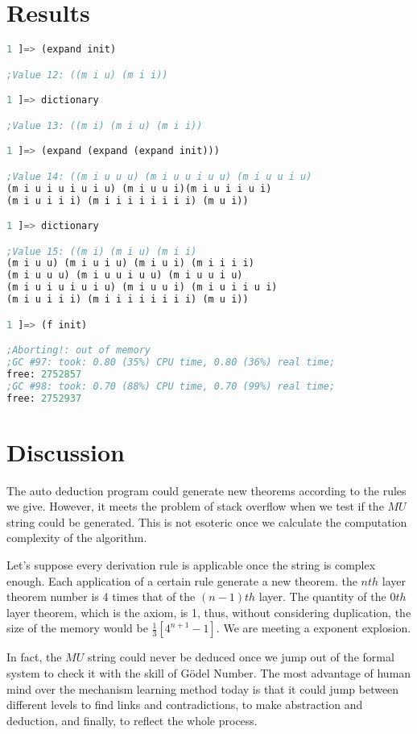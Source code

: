 \documentclass[11pt]{article}
\begin{document}
\section*{Results}
\begin{lstlisting}[language=lisp]
1 ]=> (expand init) 

;Value 12: ((m i u) (m i i)) 

1 ]=> dictionary 

;Value 13: ((m i) (m i u) (m i i)) 

1 ]=> (expand (expand (expand init))) 

;Value 14: ((m i u u u) (m i u u i u u) (m i u u i u) 
(m i u i u i u i u) (m i u u i)(m i u i i u i) 
(m i u i i i) (m i i i i i i i i) (m u i)) 

1 ]=> dictionary 

;Value 15: ((m i) (m i u) (m i i) 
(m i u u) (m i u i u) (m i u i) (m i i i i) 
(m i u u u) (m i u u i u u) (m i u u i u) 
(m i u i u i u i u) (m i u u i) (m i u i i u i)
(m i u i i i) (m i i i i i i i i) (m u i)) 

1 ]=> (f init) 

;Aborting!: out of memory 
;GC #97: took: 0.80 (35%) CPU time, 0.80 (36%) real time;
free: 2752857 
;GC #98: took: 0.70 (88%) CPU time, 0.70 (99%) real time;
free: 2752937 
\end{lstlisting}
 
\section*{Discussion}
The auto deduction program could generate new theorems according to the rules we give. However, it meets the problem of stack overflow when we test if the $MU$ string could be generated. This is not esoteric once we calculate the computation complexity of the algorithm.

Let's suppose every derivation rule is applicable once the string is complex enough. Each application of a certain rule generate a new theorem. the $nth$ layer theorem number is 4 times that of the $(n-1)th$ layer. The quantity of the $0th$ layer theorem, which is the axiom, is 1, thus, without considering duplication, the size of the memory would be $\frac{1}{3}[4^{n+1}-1]$. We are meeting a exponent explosion.

In fact, the $MU$ string could never be deduced once we jump out of the formal system to check it with the skill of G{\"o}del Number. The most advantage of human mind over the mechanism learning method today is that it could jump between different levels to find links and contradictions, to make abstraction and deduction, and finally, to reflect the whole process.
\end{document}
